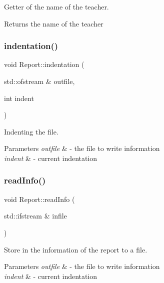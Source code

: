 Getter of the name of the teacher. 

\begin{DoxyReturn}{Returns}
the name of the teacher 
\end{DoxyReturn}
\mbox{\label{class_report_a67a10004cf149f202015d55a14efe6c1}} 
\subsubsection{\texorpdfstring{indentation()}{indentation()}}
{\footnotesize\ttfamily void Report\+::indentation (\begin{DoxyParamCaption}\item[{std\+::ofstream \&}]{outfile,  }\item[{int}]{indent }\end{DoxyParamCaption})}



Indenting the file. 


\begin{DoxyParams}{Parameters}
{\em outfile} & -\/ the file to write information \\
\hline
{\em indent} & -\/ current indentation \\
\hline
\end{DoxyParams}
\mbox{\label{class_report_ad36785f4f4531404a6464c6d5ce5a69b}} 
\subsubsection{\texorpdfstring{read\+Info()}{readInfo()}}
{\footnotesize\ttfamily void Report\+::read\+Info (\begin{DoxyParamCaption}\item[{std\+::ifstream \&}]{infile }\end{DoxyParamCaption})}



Store in the information of the report to a file. 


\begin{DoxyParams}{Parameters}
{\em outfile} & -\/ the file to write information \\
\hline
{\em indent} & -\/ current indentation \\
\hline
\end{DoxyParams}
\mbox{\label{class_report_a47faf2023bd07e59ab0296e8d0b2d512}} 

